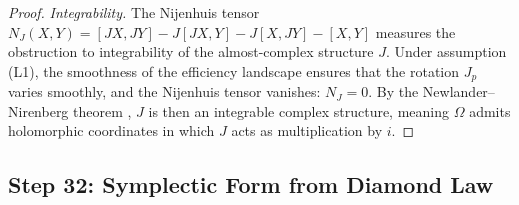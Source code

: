 \begin{proof}
\emph{Integrability.}  The Nijenhuis tensor $N_J(X, Y) = [JX, JY] -
J[JX, Y] - J[X, JY] - [X, Y]$ measures the obstruction to
integrability of the almost-complex structure $J$.  Under assumption
(L1), the smoothness of the efficiency landscape ensures that the
rotation $J_p$ varies smoothly, and the Nijenhuis tensor vanishes:
$N_J = 0$.  By the Newlander--Nirenberg theorem \citep{newlander1957},
$J$ is then an integrable complex structure, meaning $\Omega$ admits
holomorphic coordinates in which $J$ acts as multiplication by $i$.

\end{proof}


\subsection{Step 32: Symplectic Form from Diamond Law}\label{app:step32}

